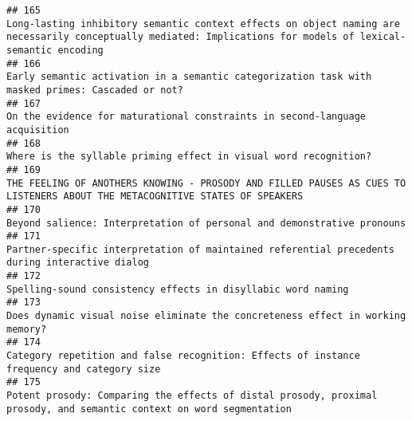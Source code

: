 \documentclass[
  english,
  man]{apa6}
\begin{document}
\begin{verbatim}
## 165                                                                            Long-lasting inhibitory semantic context effects on object naming are necessarily conceptually mediated: Implications for models of lexical-semantic encoding
## 166                                                                                                                                         Early semantic activation in a semantic categorization task with masked primes: Cascaded or not?
## 167                                                                                                                                                              On the evidence for maturational constraints in second-language acquisition
## 168                                                                                                                                                                         Where is the syllable priming effect in visual word recognition?
## 169                                                                                                              THE FEELING OF ANOTHERS KNOWING - PROSODY AND FILLED PAUSES AS CUES TO LISTENERS ABOUT THE METACOGNITIVE STATES OF SPEAKERS
## 170                                                                                                                                                                   Beyond salience: Interpretation of personal and demonstrative pronouns
## 171                                                                                                                                           Partner-specific interpretation of maintained referential precedents during interactive dialog
## 172                                                                                                                                                                             Spelling-sound consistency effects in disyllabic word naming
## 173                                                                                                                                                           Does dynamic visual noise eliminate the concreteness effect in working memory?
## 174                                                                                                                                               Category repetition and false recognition: Effects of instance frequency and category size
## 175                                                                                                                     Potent prosody: Comparing the effects of distal prosody, proximal prosody, and semantic context on word segmentation

\end{verbatim}
\end{document}
